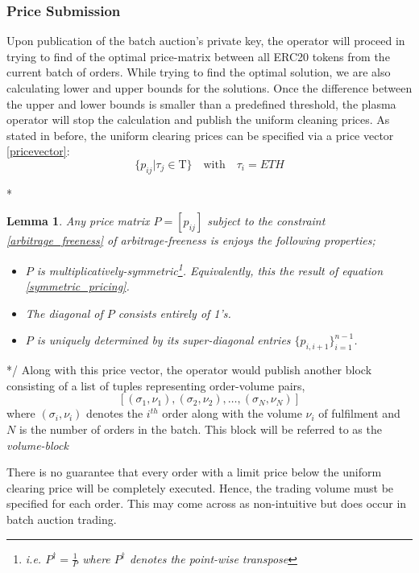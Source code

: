 \documentclass[11pt,parskip=full]{scrartcl}%
\newcommand{\Tau}{\mathrm{T}}
\newtheorem{lemma}[theorem]{Lemma}
\newcommand*{\erc}{ERC20 }
\begin{document}
\subsubsection{Price Submission}
Upon publication of the batch auction's private key, the operator will proceed in trying to find of the optimal price-matrix between all \erc tokens from the current batch of orders. 
While trying to find the optimal solution, we are also calculating lower and upper bounds for the solutions. Once the difference between the upper and lower bounds is smaller than a predefined threshold, the plasma operator will stop the calculation and publish the uniform cleaning prices.\newline
As stated in before, the uniform clearing prices can be specified via a price vector \ref{pricevector}:
\begin{equation}
\{ p_{ij}| \tau_j \in \Tau \} \quad \text{with} \quad \tau_i =ETH
\end{equation}

\/* 
\begin{lemma}
Any price matrix $P = [p_{ij}]$ subject to the constraint \ref{arbitrage_freeness} of arbitrage-freeness is enjoys the following properties;
\begin{itemize}
\item[(i)] $P$ is multiplicatively-symmetric\footnote{i.e. $P^\dagger = \frac{1}{P}$ where $P^\dagger$ denotes the point-wise transpose}. Equivalently, this the result of equation \ref{symmetric_pricing}.
\item[(ii)] The diagonal of $P$ consists entirely of 1's.
\item[(iii)]  $P$ is uniquely determined by its super-diagonal entries $\{p_{i, i+1}\}_{i=1}^{n-1}$.
\end{itemize}
\end{lemma}
*/
Along with this price vector, the operator would publish another block consisting of a list of tuples representing order-volume pairs, 
\[[(\sigma_1, \nu_1), (\sigma_2,  \nu_2), \dots, (\sigma_N, \nu_N)]\]
where $(\sigma_i, \nu_i)$ denotes the $i^{th}$ order along with the volume $\nu_i$ of fulfilment and $N$ is the number of orders in the batch. 
This block will be referred to as the \emph{volume-block}\label{volumeBlock}

There is no guarantee that every order with a limit price below the uniform clearing price will be completely executed. Hence, the trading volume must be specified for each order.
This may come across as non-intuitive but does occur in batch auction trading.
\end{document}
